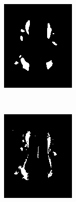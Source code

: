 \documentclass[10pt,twoside]{book}
\begin{document}
\begin{figure}
\begin{subfigure}{0.32\textwidth}
    \includegraphics[width=\textwidth]{segmentation1}
    \caption{}
    \label{fig:whiteMatterHyperIntensities_b}
  \end{subfigure}
  \\[4ex]
  \begin{subfigure}{0.32\textwidth}
    \centering
    \includegraphics[width=\textwidth]{segmentationHighThreshold}

\end{subfigure}
\end{figure}
\end{document}
